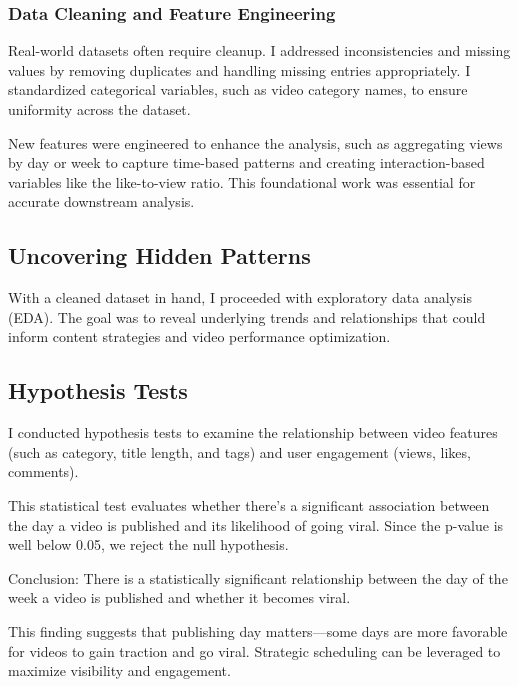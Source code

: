 \documentclass[a4paper]{article}
\begin{document}
\begin{multicols}{2}


\subsubsection{Data Cleaning and Feature Engineering} Real-world datasets often require cleanup. I addressed inconsistencies and missing values by removing duplicates and handling missing entries appropriately. I standardized categorical variables, such as video category names, to ensure uniformity across the dataset.

New features were engineered to enhance the analysis, such as aggregating views by day or week to capture time-based patterns and creating interaction-based variables like the like-to-view ratio. This foundational work was essential for accurate downstream analysis.

\subsection{Uncovering Hidden Patterns} With a cleaned dataset in hand, I proceeded with exploratory data analysis (EDA). The goal was to reveal underlying trends and relationships that could inform content strategies and video performance optimization.

\subsection{Hypothesis Tests} I conducted hypothesis tests to examine the relationship between video features (such as category, title length, and tags) and user engagement (views, likes, comments).


This statistical test evaluates whether there's a significant association between the day a video is published and its likelihood of going viral.
Since the p-value is well below 0.05, we reject the null hypothesis.

Conclusion: There is a statistically significant relationship between the day of the week a video is published and whether it becomes viral.

This finding suggests that publishing day matters—some days are more favorable for videos to gain traction and go viral. Strategic scheduling can be leveraged to maximize visibility and engagement.

\end{multicols}
\end{document}
